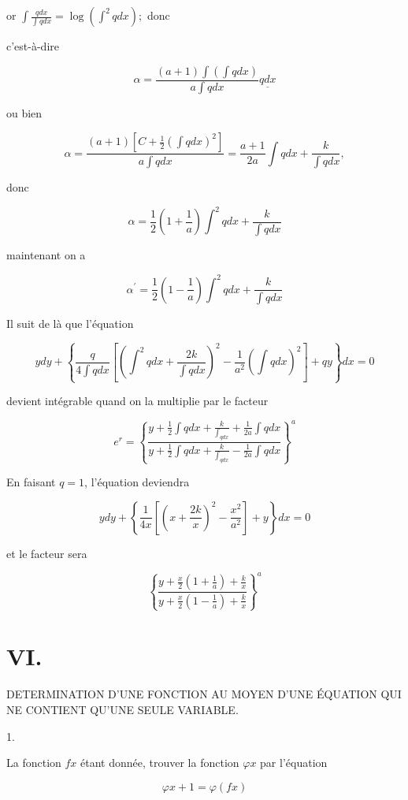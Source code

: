 \documentclass{article}
\begin{document}
or \(\int \frac{q d x}{\int q d x}=\log \left(\int^{2} q d x\right) ;\) donc

c'est-à-dire

\[
\alpha=\frac{(a+1) \int\left(\int q d x\right)}{a \int q d x} \underline{q d x}
\]

ou bien

\[
\alpha=\frac{(a+1)\left[C+\frac{1}{2}\left(\int q d x\right)^{2}\right]}{a \int q d x}=\frac{a+1}{2 a} \int q d x+\frac{k}{\int q d x},
\]

donc

\[
\alpha=\frac{1}{2}\left(1+\frac{1}{a}\right) \int^{2} q d x+\frac{k}{\int q d x}
\]

maintenant on a

\[
\alpha^{\prime}=\frac{1}{2}\left(1-\frac{1}{a}\right) \int^{2} q d x+\frac{k}{\int q d x}
\]


Il suit de là que l'équation

\[
y d y+\left\{\frac{q}{4 \int q d x}\left[\left(\int^{2} q d x+\frac{2 k}{\int q d x}\right)^{2}-\frac{1}{a^{2}}\left(\int q d x\right)^{2}\right]+q y\right\} d x=0
\]

devient intégrable quand on la multiplie par le facteur

\[
e^{r}=\left\{\frac{y+\frac{1}{2} \int q d x+\frac{k}{\int_{q d x}}+\frac{1}{2 a} \int q d x}{y+\frac{1}{2} \int q d x+\frac{k}{\int_{q d x}}-\frac{1}{2 a} \int q d x}\right\}^{a}
\]

En faisant \(q=1\), l'équation deviendra

\[
y d y+\left\{\frac{1}{4 x}\left[\left(x+\frac{2 k}{x}\right)^{2}-\frac{x^{2}}{a^{2}}\right]+y\right\} d x=0
\]

et le facteur sera

\[
\left\{\frac{y+\frac{x}{2}\left(1+\frac{1}{a}\right)+\frac{k}{x}}{y+\frac{x}{2}\left(1-\frac{1}{a}\right)+\frac{k}{x}}\right\}^{a}
\]

\section*{VI.}

DETERMINATION D'UNE FONCTION AU MOYEN D'UNE ÉQUATION QUI NE CONTIENT QU'UNE SEULE VARIABLE.

1.

La fonction \(f x\) étant donnée, trouver la fonction \(\varphi x\) par l'équation

\[
\varphi x+1=\varphi(f x)
\]
\end{document}
